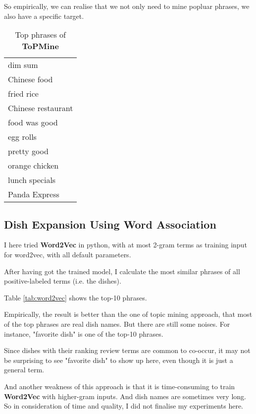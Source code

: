 \documentclass[11pt]{article}
\begin{document}
So empirically, we can realise that we not only need to mine popluar phrases, we also have a specific target.

\begin{table}
  \centering
  \begin{tabular}{l}
    \hline
    dim sum \\
    Chinese food \\
    fried rice \\
    Chinese restaurant \\
    food was good \\
    egg rolls \\
    pretty good \\
    orange chicken \\
    lunch specials \\
    Panda Express \\
    \hline
  \end{tabular}
  \caption{Top phrases of \textbf{ToPMine}}
  \label{tab:topmine}
\end{table}

\subsection{Dish Expansion Using Word Association}

I here tried \textbf{Word2Vec} in python, with at most 2-gram terms as training input for word2vec, with all default parameters.

After having got the trained model, I calculate the most similar phrases of all positive-labeled terms (i.e. the dishes).

Table \ref{tab:word2vec} shows the top-10 phrases.

\vspace{1.5em}
Empirically, the result is better than the one of topic mining approach, that most of the top phrases are real dish names.
But there are still some noises. For instance, "favorite dish" is one of the top-10 phrases.

Since dishes with their ranking review terms are common to co-occur, it may not be surprising to see "favorite dish" to show up here, even though it is just a general term.

And another weakness of this approach is that it is time-consuming to train \textbf{Word2Vec} with higher-gram inputs. And dish names are sometimes very long.
So in consideration of time and quality, I did not finalise my experiments here.
\end{document}
